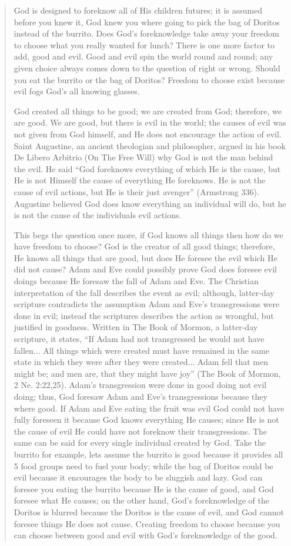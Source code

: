 			\begin{quote}
				God is designed to foreknow all of His children futures; it is assumed before you knew it, God knew you where going to pick the bag of Doritos instead of the burrito. Does God’s foreknowledge take away your freedom to choose what you really wanted for lunch? There is one more factor to add, good and evil. Good and evil spin the world round and round; any given choice always comes down to the question of right or wrong. Should you eat the burrito or the bag of Doritos? Freedom to choose exist because evil fogs God’s all knowing glasses. 

				God created all things to be good; we are created from God; therefore, we are good. We are good, but there is evil in the world; the causes of evil was not given from God himself, and He does not encourage the action of evil. Saint Augustine, an ancient theologian and philosopher, argued in his book De Libero Arbitrio (On The Free Will) why God is not the man behind the evil. He said ``God foreknows everything of which He is the cause, but He is not Himself the cause of everything He foreknows. He is not the cause of evil actions, but He is their just avenger'' (Armstrong 336). Augustine believed God does know everything an individual will do, but he is not the cause of the individuals evil actions.

				This begs the question once more, if God knows all things then how do we have freedom to choose? God is the creator of all good things; therefore, He knows all things that are good, but does He foresee the evil which He did not cause? Adam and Eve could possibly prove God does foresee evil doings because He foresaw the fall of Adam and Eve. The Christian interpretation of the fall describes the event as evil; although, latter-day scripture contradicts the assumption Adam and Eve’s transgressions were done in evil; instead the scriptures describes the action as wrongful, but justified in goodness. Written in The Book of Mormon, a latter-day scripture, it states, ``If Adam had not transgressed he would not have fallen... All things which were created must have remained in the same state in which they were after they were created... Adam fell that men might be; and men are, that they might have joy'' (The Book of Mormon, 2 Ne. 2:22,25). Adam’s transgression were done in good doing not evil doing; thus, God foresaw Adam and Eve’s transgressions because they where good. If Adam and Eve eating the fruit was evil God could not have fully foreseen it because God knows everything He causes; since He is not the cause of evil He could have not foreknow their transgressions. The same can be said for every single individual created by God. Take the burrito for example, lets assume the burrito is good because it provides all 5 food groups need to fuel your body; while the bag of Doritos could be evil because it encourages the body to be sluggish and lazy. God can foresee you eating the burrito because He is the cause of good, and God foresee what He causes; on the other hand, God’s foreknowledge of the Doritos is blurred because the Doritos is the cause of evil, and God cannot foresee things He does not cause. Creating freedom to choose because you can choose between good and evil with God’s foreknowledge of the good. 


\end{quote}

